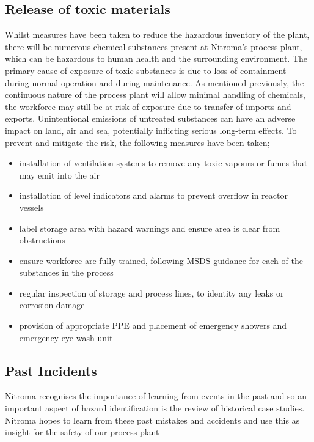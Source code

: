 \subsection{Release of toxic materials}

Whilst measures have been taken to reduce the hazardous inventory of the plant, there will be numerous chemical substances present at Nitroma's process plant, which can be hazardous to human health and the surrounding environment. The primary cause of exposure of toxic substances is due to loss of containment during normal operation and during maintenance. As mentioned previously, the continuous nature of the process plant will allow minimal handling of chemicals, the workforce may still be at risk of exposure due to transfer of imports and exports. Unintentional emissions of untreated substances can have an adverse impact on land, air and sea, potentially inflicting serious long-term effects. To prevent and mitigate the risk, the following measures have been taken;

\begin{itemize}
    \item installation of ventilation systems to remove any toxic vapours or fumes that may emit into the air
    \item installation of level indicators and alarms to prevent overflow in reactor vessels 
    \item label storage area with hazard warnings and ensure area is clear from obstructions 
    \item ensure workforce are fully trained, following MSDS guidance for each of the substances in the process
    \item regular inspection of storage and process lines, to identity any leaks or corrosion damage 
    \item provision of appropriate PPE and placement of emergency showers and emergency eye-wash unit
\end{itemize}




\subsection{Past Incidents}

Nitroma recognises the importance of learning from events in the past and so an important aspect of hazard identification is the review of historical case studies. Nitroma hopes to learn from these past mistakes and accidents and use this as insight for the safety of our process plant


